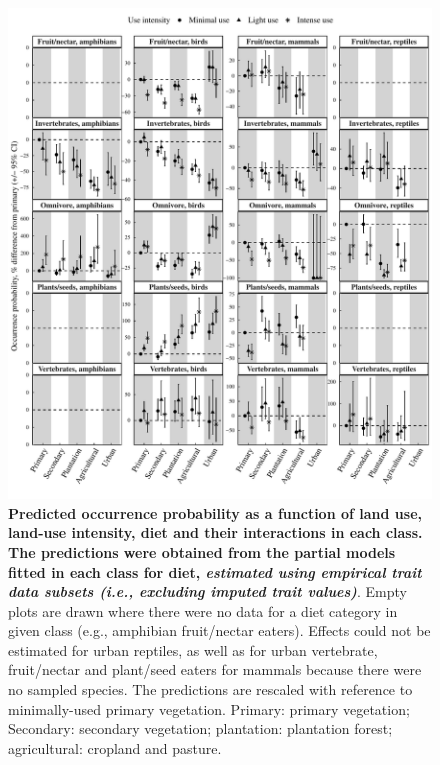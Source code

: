 \documentclass[11pt]{article}
\begin{document}
\begin{figure}[h!]
\centering
\includegraphics[scale=0.65]{Figures/Partial_models_predictions/Validations/Diet}
\caption[Predicted occurrence probability as a function of land use, land-use intensity, diet and their interactions in each class: from validation models using empirical, non imputed trait values]{\textbf{Predicted occurrence probability as a function of land use, land-use intensity, diet and their interactions in each class. The predictions were obtained from the partial models fitted in each class for diet, \textit{estimated using empirical trait data subsets (i.e., excluding imputed trait values)}}. Empty plots are drawn where there were no data for a diet category in  given class (e.g., amphibian fruit/nectar eaters). Effects could not be estimated for urban reptiles, as well as for urban vertebrate, fruit/nectar and plant/seed eaters for mammals because there were no sampled species. The predictions are rescaled with reference to minimally-used primary vegetation. Primary: primary vegetation; Secondary: secondary vegetation; plantation: plantation forest; agricultural: cropland and pasture.}
\label{SI_4_Figure_23}
\end{figure}
\end{document}
